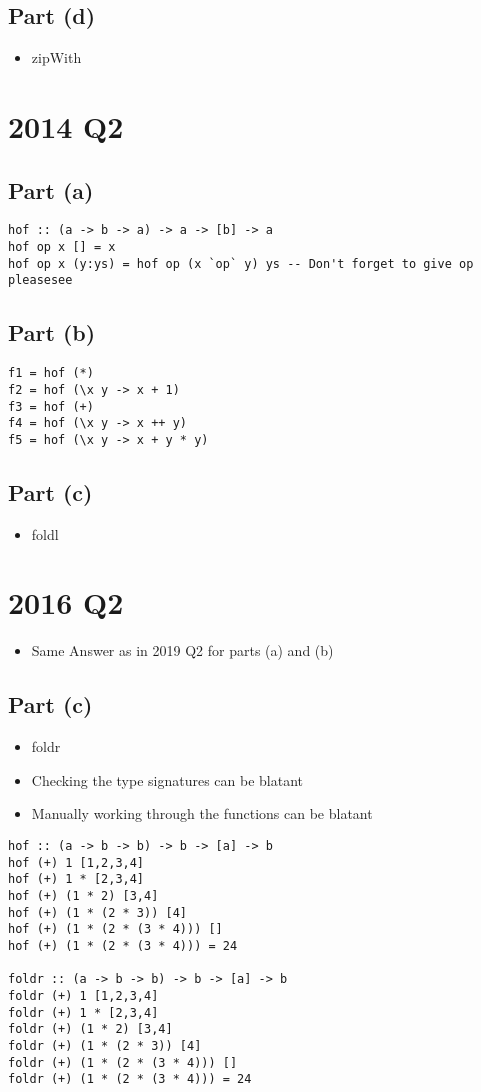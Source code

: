 \documentclass[11pt]{article}
\begin{document}
\subsection{Part (d)}
\label{sec:orgaf1f33e}
\begin{itemize}
\item zipWith
\end{itemize}
\section{2014 Q2}
\label{sec:orgb1c2e31}
\subsection{Part (a)}
\label{sec:orga30a54c}
\begin{verbatim}
hof :: (a -> b -> a) -> a -> [b] -> a
hof op x [] = x
hof op x (y:ys) = hof op (x `op` y) ys -- Don't forget to give op pleasesee
\end{verbatim}
\subsection{Part (b)}
\label{sec:org03295c6}
\begin{verbatim}
f1 = hof (*)
f2 = hof (\x y -> x + 1)
f3 = hof (+)
f4 = hof (\x y -> x ++ y)
f5 = hof (\x y -> x + y * y)
\end{verbatim}
\subsection{Part (c)}
\label{sec:org941ebb7}
\begin{itemize}
\item foldl
\end{itemize}
\newpage
\section{2016 Q2}
\label{sec:org76bda11}
\begin{itemize}
\item Same Answer as in 2019 Q2 for parts (a) and (b)
\end{itemize}
\subsection{Part (c)}
\label{sec:org4d13d0a}
\begin{itemize}
\item foldr
\item Checking the type signatures can be blatant
\item Manually working through the functions can be blatant
\end{itemize}
\begin{verbatim}
hof :: (a -> b -> b) -> b -> [a] -> b
hof (+) 1 [1,2,3,4]
hof (+) 1 * [2,3,4]
hof (+) (1 * 2) [3,4]
hof (+) (1 * (2 * 3)) [4]
hof (+) (1 * (2 * (3 * 4))) []
hof (+) (1 * (2 * (3 * 4))) = 24

foldr :: (a -> b -> b) -> b -> [a] -> b
foldr (+) 1 [1,2,3,4]
foldr (+) 1 * [2,3,4]
foldr (+) (1 * 2) [3,4]
foldr (+) (1 * (2 * 3)) [4]
foldr (+) (1 * (2 * (3 * 4))) []
foldr (+) (1 * (2 * (3 * 4))) = 24
\end{verbatim}
\end{document}
